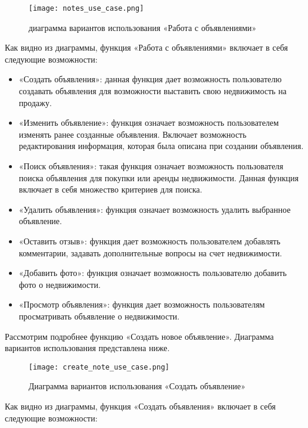 \begin{figure}[!htb]
	\centering
	\texttt{[image: notes\_use\_case.png]}
	\caption{ диаграмма вариантов использования «Работа с объявлениями»}
	\label{fig:arch_and_mod::lexer_flow}
	\clearpage
\end{figure}

Как видно из диаграммы, функция «Работа с объявлениями» включает в себя следующие возможности:

\begin{itemize}
	\item «Создать объявления»: данная функция дает возможность пользователю создавать объявления для возможности выставить свою недвижимость на продажу. 
	\item «Изменить объявление»: функция означает возможность пользователем изменять ранее созданные объявления. Включает возможность редактирования информация, которая была описана при создании объявления.
	\item «Поиск объявления»: такая функция означает возможность пользователя поиска объявления для покупки или аренды недвижимости. Данная функция включает в себя множество критериев для поиска.
	\item «Удалить объявления»: функция означает возможность удалить выбранное объявление.
	\item «Оставить отзыв»: функция дает возможность пользователем добавлять комментарии, задавать дополнительные вопросы на счет недвижимости.
	\item «Добавить фото»: функция означает возможность пользователю добавить фото о недвижимости.
	\item «Просмотр объявления»: функция дает возможность пользователям просматривать объявление о недвижимости.
\end{itemize}

Рассмотрим подробнее функцию «Создать новое объявление». Диаграмма вариантов использования представлена ниже.


\begin{figure}[!htb]
	\centering
	\texttt{[image: create\_note\_use\_case.png]}
	\caption{ Диаграмма вариантов использования «Создать объявление»}
	\label{fig:arch_and_mod::lexer_flow}
	\clearpage
\end{figure}

Как видно из диаграммы, функция «Создать объявления» включает в себя следующие возможности:

